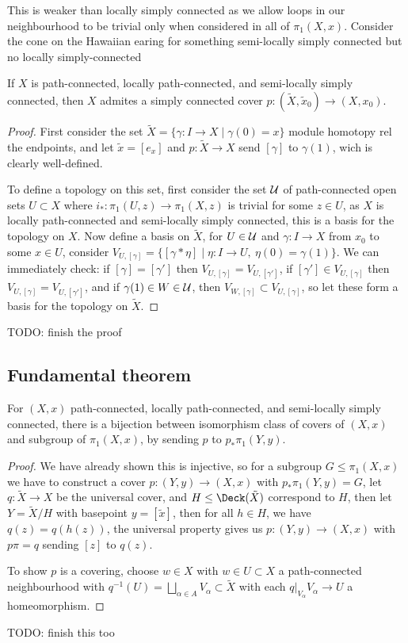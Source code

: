\documentclass{article}
\begin{document}
This is weaker than locally simply connected as we allow loops in our neighbourhood to be trivial only when considered in all of $\pi_1(X,x)$. Consider the cone on the Hawaiian earing for something semi-locally simply connected but no locally simply-connected

\begin{theorem}
    If $X$ is path-connected, locally path-connected, and semi-locally simply connected, then $X$ admites a simply connected cover $p:(\tilde{X},\tilde{x}_0)\rightarrow (X,x_0)$.\begin{proof}
        First consider the set $\tilde{X} = \{\gamma:I\rightarrow X \mid \gamma(0) = x\}$ module homotopy rel the endpoints, and let $\tilde{x}=[e_x]$ and $p:\tilde{X}\rightarrow X$ send $[\gamma]$ to $\gamma(1)$, wich is clearly well-defined.

        To define a topology on this set, first consider the set $\mathcal{U}$ of path-connected open sets $U\subset X$ where $i_*:\pi_1(U,z)\rightarrow \pi_1(X,z)$ is trivial for some $z\in U$, as $X$ is locally path-connected and semi-locally simply connected, this is a basis for the topology on $X$. Now define a basis on $\tilde{X}$, for $U\in \mathcal{U}$ and $\gamma:I\rightarrow X$ from $x_0$ to some $x\in U$, consider $V_{U,[\gamma]} = \{[\gamma * \eta] \mid \eta :I\rightarrow U, \ \eta(0)=\gamma(1)\}$. We can immediately check: if $[\gamma] = [\gamma']$ then $V_{U,[\gamma]} = V_{U,[\gamma']}$, if $[\gamma']\in V_{U,[\gamma]}$ then $V_{U,[\gamma]}=V_{U,[\gamma']}$, and if $\gamma(1)\in W \in \mathcal{U}$, then $V_{W,[\gamma]}\subset V_{U,[\gamma]}$, so let these form a basis for the topology on $\tilde{X}$.
    \end{proof}
    TODO: finish the proof
\end{theorem}

\subsection{Fundamental theorem}

\begin{theorem}
    For $(X,x)$ path-connected, locally path-connected, and semi-locally simply connected, there is a bijection between isomorphism class of covers of $(X,x)$ and subgroup of $\pi_1(X,x)$, by sending $p$ to $p_*\pi_1(Y,y)$.\begin{proof}
        We have already shown this is injective, so for a subgroup $G\leq \pi_1(X,x)$ we have to construct a cover $p:(Y,y)\rightarrow (X,x)$ with $p_*\pi_1(Y,y)=G$, let $q:\tilde{X}\rightarrow X$ be the universal cover, and $H\leq \Deck(\tilde{X})$ correspond to $H$, then let $Y = \tilde{X}/H$ with basepoint $y=[\tilde{x}]$, then for all $h\in H$, we have $q(z)=q(h(z))$, the universal property gives us $p:(Y,y)\rightarrow (X,x)$ with $p\pi = q$ sending $[z]$ to $q(z)$.

        To show $p$ is a covering, choose $w\in X$ with $w\in U \subset X$ a path-connected neighbourhood with $q^{-1}(U) = \bigsqcup_{\alpha\in A} V_\alpha \subset \tilde{X}$ with each $q\vert_{V_\alpha}V_\alpha\rightarrow U$ a homeomorphism.
    \end{proof}

    TODO: finish this too
\end{theorem}
\end{document}
